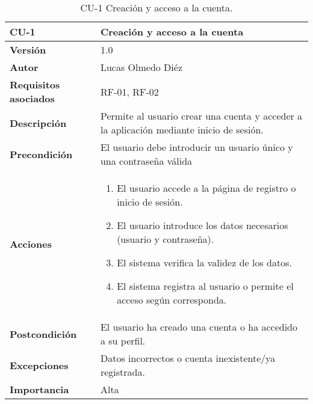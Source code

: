 \clearpage
\begin{table}[p]
	\centering
	\begin{tabularx}{\linewidth}{ p{} p{} }
        \toprule
        \textbf{CU-1}    & \textbf{Creación y acceso a la cuenta} \\
        \toprule
        \textbf{Versión}              & 1.0 \\
        \textbf{Autor}                & Lucas Olmedo Diéz \\
        \textbf{Requisitos asociados} & RF-01, RF-02 \\
        \textbf{Descripción}          & Permite al usuario crear una cuenta y acceder a la aplicación mediante inicio de sesión. \\
        \textbf{Precondición}         & El usuario debe introducir un usuario único y una contraseña válida \\
        \textbf{Acciones}             &
        \begin{enumerate}
            \def\labelenumi{\arabic{enumi}.}
            \tightlist
            \item El usuario accede a la página de registro o inicio de sesión.
            \item El usuario introduce los datos necesarios (usuario y contraseña).
            \item El sistema verifica la validez de los datos.
            \item El sistema registra al usuario o permite el acceso según corresponda.
        \end{enumerate}\\
        \textbf{Postcondición}        & El usuario ha creado una cuenta o ha accedido a su perfil. \\
        \textbf{Excepciones}          & Datos incorrectos o cuenta inexistente/ya registrada. \\
        \textbf{Importancia}          & Alta \\
        \bottomrule
    \end{tabularx}
    \caption{CU-1 Creación y acceso a la cuenta.}
\end{table}

